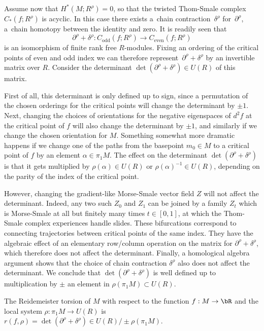 Assume now that $H^*(M ; R^\rho)=0$, so that the twisted Thom-Smale complex $C_*(f ; R^\rho)$ is acyclic. In this case there exists a~chain contraction~$\delta^\rho$ for~$\partial^\rho$, \ie a~chain homotopy between the identity and zero. It is readily seen that
\[
\partial^\rho+\delta^\rho : C_{\text{odd}} (f ;R^\rho) \to C_{\text{even}}(f ; R^\rho)
\]
is an isomorphism of finite rank free $R$\nobreakdash-modules. Fixing an ordering of the critical points of even and odd index we can therefore represent~$\partial^\rho+\delta^\rho$ by an invertible matrix over $R$. Consider the determinant $\det(\partial^\rho+\delta^\rho) \in U(R)$ of this matrix.

First of all, this determinant is only defined up to sign, since a permutation of the chosen orderings for the critical points will change the determinant by $\pm1 $. Next, changing the choices of orientations for the negative eigenspaces of $d^2f$ at the critical point of $f$ will also change the determinant by $\pm 1$, and similarly if we change the chosen orientation for $M$. Something somewhat more dramatic happens if we change one of the paths from the basepoint $m_0\in M$ to a critical point of $f$ by an element $\alpha \in \pi_1M$. The effect on the determinant $\det(\partial^\rho + \delta^\rho)$ is that it gets multiplied by $\rho(\alpha) \in U(R)$ or $\rho(\alpha)^{-1} \in U(R)$, depending on the parity of the index of the critical point.

However, changing the gradient-like Morse-Smale vector field $Z$ will not affect the determinant. Indeed, any two such $Z_0$ and $Z_1$ can be joined by a family $Z_t$ which is Morse-Smale at all but finitely many times $t \in [0,1]$, at which the Thom-Smale complex experiences handle slides. These bifurcations correspond to connecting trajectories between critical points of the same index. They have the algebraic effect of an elementary row/column operation on the matrix for $\partial^\rho+\delta^\rho$, which therefore does not affect the determinant. Finally, a homological algebra argument shows that the choice of chain contraction $\delta^\rho$ also does not affect the determinant. We conclude that $\det(\partial^\rho+\delta^\rho)$ is well defined up to multiplication by $\pm$ an element in $\rho(\pi_1M) \subset U(R)$.

\begin{definition}\label{reidemeisterdef}
The Reidemeister torsion of $M$ with respect to the function $f:M \to \bR$ and the local system $\rho: \pi_1M \to U(R)$ is $r(f, \rho) = \det(\partial^\rho+\delta^\rho) \in U(R) / \pm \rho( \pi_1M )$.
\end{definition}


